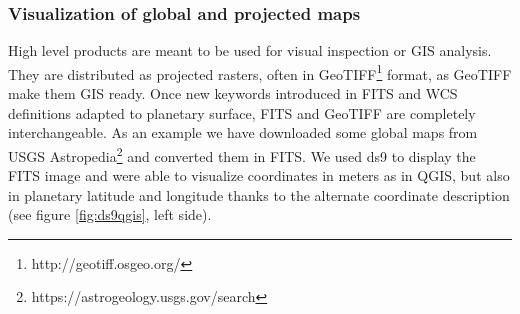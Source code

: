 \subsubsection{Visualization of global and projected maps}
High level products are meant to be used for visual inspection or GIS analysis.
They are distributed as projected rasters, often in GeoTIFF\footnote{http://geotiff.osgeo.org/}
format, as GeoTIFF make them GIS ready.
Once new keywords introduced in FITS and WCS definitions adapted to planetary surface, FITS
and GeoTIFF are completely interchangeable.
As an example we have downloaded some global maps from USGS
Astropedia\footnote{https://astrogeology.usgs.gov/search} and converted them in FITS.
We used ds9 to display the FITS image and were able to visualize coordinates in meters
as in QGIS, but also in planetary latitude and longitude thanks to the alternate coordinate
description (see figure \ref{fig:ds9qgis}, left side).

